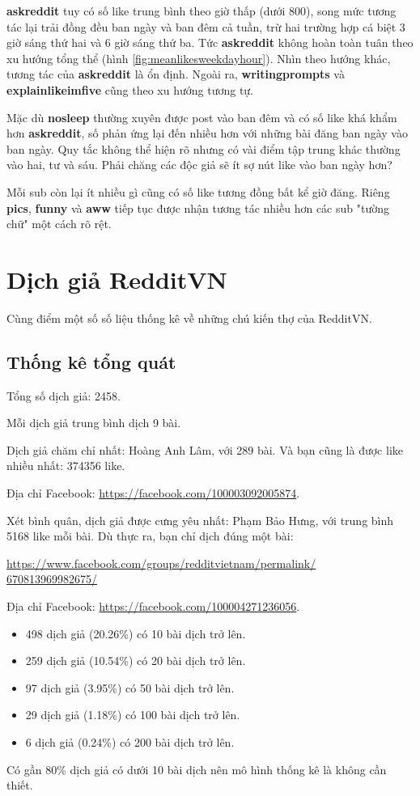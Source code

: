 \documentclass[10pt,a4paper]{article}
\begin{document}
\textbf{askreddit} tuy có số like trung bình theo giờ thấp (dưới 800), song mức tương tác lại trải đồng đều ban ngày và ban đêm cả tuần, trừ hai trường hợp cá biệt 3 giờ sáng thứ hai và 6 giờ sáng thứ ba. Tức \textbf{askreddit} không hoàn toàn tuân theo xu hướng tổng thể (hình \eqref{fig:meanlikesweekdayhour}). Nhìn theo hướng khác, tương tác của \textbf{askreddit} là ổn định. Ngoài ra, \textbf{writingprompts} và \textbf{explainlikeimfive} cũng theo xu hướng tương tự.

Mặc dù \textbf{nosleep} thường xuyên được post vào ban đêm và có số like khá khẩm hơn \textbf{askreddit}, số phản ứng lại đến nhiều hơn với những bài đăng ban ngày vào ban ngày. Quy tắc không thể hiện rõ nhưng có vài điểm tập trung khác thường vào hai, tư và sáu. Phải chăng các độc giả sẽ ít sợ nút like vào ban ngày hơn?

Mỗi sub còn lại ít nhiều gì cũng có số like tương đồng bất kể giờ đăng. Riêng \textbf{pics}, \textbf{funny} và \textbf{aww} tiếp tục được nhận tương tác nhiều hơn các sub "tường chữ" một cách rõ rệt.

\section{Dịch giả RedditVN}
Cùng điểm một số số liệu thống kê về những chú kiến thợ của RedditVN.
\subsection{Thống kê tổng quát}
Tổng số dịch giả: 2458.

Mỗi dịch giả trung bình dịch 9 bài.

Dịch giả chăm chỉ nhất: Hoàng Anh Lâm, với 289 bài. Và bạn cũng là được like nhiều nhất: 374356 like.

Địa chỉ Facebook: \href{https://facebook.com/100003092005874}{https://facebook.com/100003092005874}.

Xét bình quân, dịch giả được cưng yêu nhất: Phạm Bảo Hưng, với trung bình 5168 like mỗi bài. Dù thực ra, bạn chỉ dịch đúng một bài:

\href{https://www.facebook.com/groups/redditvietnam/permalink/670813969982675/}{https://www.facebook.com/groups/redditvietnam/permalink/\\670813969982675/}

Địa chỉ Facebook: \href{https://facebook.com/100004271236056}{https://facebook.com/100004271236056}.

\begin{itemize}
    \item 498 dịch giả (20.26\%) có 10 bài dịch trở lên.
    \item 259 dịch giả (10.54\%) có 20 bài dịch trở lên.
    \item 97 dịch giả (3.95\%) có 50 bài dịch trở lên.
    \item 29 dịch giả (1.18\%) có 100 bài dịch trở lên.
    \item 6 dịch giả (0.24\%) có 200 bài dịch trở lên.
\end{itemize}

Có gần 80\% dịch giả có dưới 10 bài dịch nên mô hình thống kê là không cần thiết.
\end{document}
